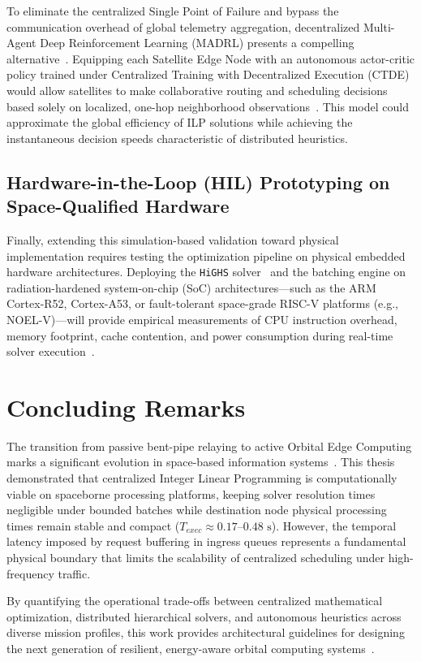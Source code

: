 To eliminate the centralized Single Point of Failure and bypass the communication overhead of global telemetry aggregation, decentralized Multi-Agent Deep Reinforcement Learning (MADRL) presents a compelling alternative~\cite{fan2025satellite}. Equipping each Satellite Edge Node with an autonomous actor-critic policy trained under Centralized Training with Decentralized Execution (CTDE) would allow satellites to make collaborative routing and scheduling decisions based solely on localized, one-hop neighborhood observations~\cite{fan2025satellite}. This model could approximate the global efficiency of ILP solutions while achieving the instantaneous decision speeds characteristic of distributed heuristics.

\subsection{Hardware-in-the-Loop (HIL) Prototyping on Space-Qualified Hardware}
\label{subsec:future_hil}

Finally, extending this simulation-based validation toward physical implementation requires testing the optimization pipeline on physical embedded hardware architectures. Deploying the \texttt{HiGHS} solver~\cite{huangfu2018highs} and the batching engine on radiation-hardened system-on-chip (SoC) architectures—such as the ARM Cortex-R52, Cortex-A53, or fault-tolerant space-grade RISC-V platforms (e.g., NOEL-V)—will provide empirical measurements of CPU instruction overhead, memory footprint, cache contention, and power consumption during real-time solver execution~\cite{denby2020asplos}.

\section{Concluding Remarks}
\label{sec:concl_closing}

The transition from passive bent-pipe relaying to active Orbital Edge Computing marks a significant evolution in space-based information systems~\cite{survey_orbital_edge_2023, denby2019orbital, tiansuan2023}. This thesis demonstrated that centralized Integer Linear Programming is computationally viable on spaceborne processing platforms, keeping solver resolution times negligible under bounded batches while destination node physical processing times remain stable and compact ($T_{exec} \approx 0.17\text{--}0.48\text{ s}$). However, the temporal latency imposed by request buffering in ingress queues represents a fundamental physical boundary that limits the scalability of centralized scheduling under high-frequency traffic.

By quantifying the operational trade-offs between centralized mathematical optimization, distributed hierarchical solvers, and autonomous heuristics across diverse mission profiles, this work provides architectural guidelines for designing the next generation of resilient, energy-aware orbital computing systems~\cite{icdcs_satellite_2025}.